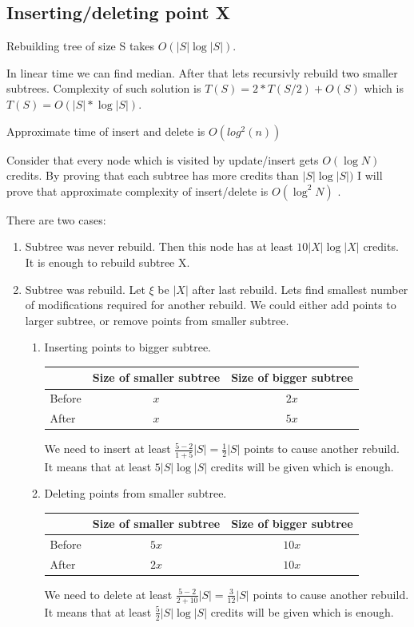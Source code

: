 \documentclass{llncs}
\begin{document}
\subsection{Inserting/deleting point X}
\begin{lemma}\label{lem:1}
Rebuilding tree of size S takes $O(|S| \log |S|)$.
\end{lemma}

In linear time we can find median. After that lets recursivly rebuild two smaller subtrees. Complexity of such solution is $T(S) = 2 * T(S/2) + O(S)$ which is $T(S) = O(|S| * \log |S|).$

\begin{lemma}\label{lem:2}
Approximate time of insert and delete is $O(log^2 (n))$
\end{lemma}

Consider that every node which is visited by update/insert gets $O(\log N)$ credits. By proving that each subtree has more credits than $|S| \log |S|)$ I will prove that approximate complexity of insert/delete is $O(\log^2{N})$ .

There are two cases:
\begin{enumerate}
\item Subtree was never rebuild. Then this node has at least $10 |X| \log |X|$ credits. It is enough to rebuild subtree X.
\item Subtree was rebuild. Let $\xi$ be $|X|$ after last rebuild. Lets find smallest number of modifications required for another rebuild. We could either add points to larger subtree, or remove points from smaller subtree.
\begin{enumerate}
\item Inserting points to bigger subtree.

\begin{tabular}{|l|c|c|}
\hline  & Size of smaller subtree & Size of bigger subtree  \\
\hline Before & $x$ & $2x$ \\
\hline After & $x$ & $5x$ \\
\hline 
\end{tabular}

We need to insert at least $ \frac{5 - 2}{1 + 5} |S| = \frac{1}{2} |S|$ points to cause another rebuild. It means that at least $5 |S| \log |S|$ credits will be given which is enough. 

\bigskip
\item Deleting points from smaller subtree.

\begin{tabular}{|l|c|c|}
\hline  & Size of smaller subtree & Size of bigger subtree  \\
\hline Before & $5x$ & $10x$ \\
\hline After & $2x$ & $10x$ \\
\hline 
\end{tabular}

We need to delete at least $\frac{5 - 2}{2 + 10} |S| = \frac{3}{12} |S|$ points to cause another rebuild. It means that at least $\frac{5}{2} |S| \log |S|$ credits will be given which is enough. 

\end{enumerate}
\end{enumerate}
\end{document}
